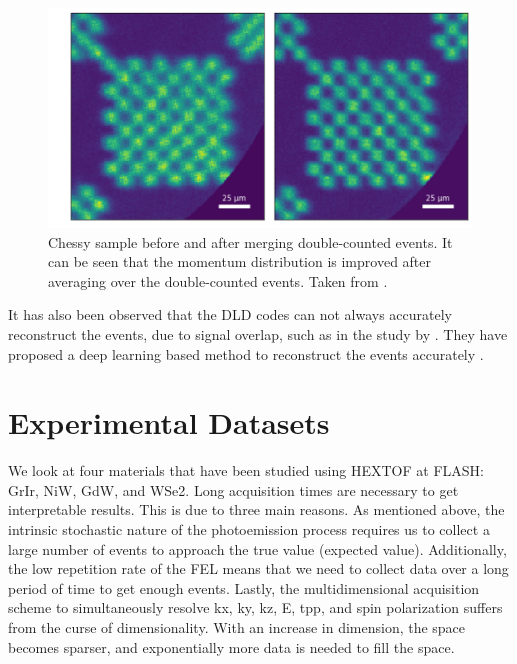 \begin{figure}[h]
    \centering
    \includegraphics[width=0.7\linewidth]{images/chessy_deblurring_merged_events.png}
    \caption{Chessy sample before and after merging double-counted events. It can be seen that the momentum distribution is improved after averaging over the double-counted events. Taken from \cite{heberStudiesUltrafastDynamics2024}.}
    \label{fig:chessy-distribution}
\end{figure}


It has also been observed that the \gls{DLD} codes can not always accurately reconstruct the events, due to signal overlap, such as in the study by \citeauthor{knipferDeepLearningbasedSpatiotemporal2024}. They have proposed a deep learning based method to reconstruct the events accurately \cite{knipferDeepLearningbasedSpatiotemporal2024}.

\section{Experimental Datasets}\label{section:datasets}
We look at four materials that have been studied using \gls{HEXTOF} at \gls{FLASH}: \gls{GrIr}, \gls{NiW}, \gls{GdW}, and \gls{WSe2}. Long acquisition times are necessary to get interpretable results. This is due to three main reasons. As mentioned above, the intrinsic stochastic nature of the photoemission process requires us to collect a large number of events to approach the true value (expected value). Additionally, the low repetition rate of the \gls{FEL} means that we need to collect data over a long period of time to get enough events. Lastly, the multidimensional acquisition scheme to simultaneously resolve \gls{kx}, \gls{ky}, \gls{kz}, \gls{E}, \gls{tpp}, and spin polarization suffers from the curse of dimensionality. With an increase in dimension, the space becomes sparser, and exponentially more data is needed to fill the space.

